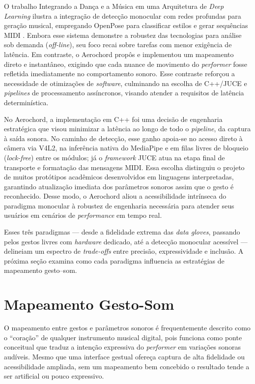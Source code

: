 O trabalho Integrando a Dança e a Música em uma Arquitetura de \textit{Deep Learning} ilustra a integração de detecção monocular com redes profundas para geração musical, empregando OpenPose para classificar estilos e gerar sequências MIDI \cite{Lima2021Integrando}. Embora esse sistema demonstre a robustez das tecnologias para análise sob demanda (\textit{off-line}), seu foco recai sobre tarefas com menor exigência de latência. Em contraste, o Aerochord propôs e implementou um mapeamento direto e instantâneo, exigindo que cada nuance de movimento do \textit{performer} fosse refletida imediatamente no comportamento sonoro. Esse contraste reforçou a necessidade de otimizações de \textit{software}, culminando na escolha de C++/JUCE e \textit{pipelines} de processamento assíncronos, visando atender a requisitos de latência determinística.

No Aerochord, a implementação em C++ foi uma decisão de engenharia estratégica que visou minimizar a latência ao longo de todo o \textit{pipeline}, da captura à saída sonora. No caminho de detecção, esse ganho apoia-se no acesso direto à câmera via V4L2, na inferência nativa do MediaPipe e em filas livres de bloqueio (\textit{lock-free}) entre os módulos; já o \textit{framework} JUCE atua na etapa final de transporte e formatação das mensagens MIDI. Essa escolha distinguiu o projeto de muitos protótipos acadêmicos desenvolvidos em linguagens interpretadas, garantindo atualização imediata dos parâmetros sonoros assim que o gesto é reconhecido. Desse modo, o Aerochord aliou a acessibilidade intrínseca do paradigma monocular à robustez de engenharia necessária para atender seus usuários em cenários de \textit{performance} em tempo real.

Esses três paradigmas — desde a fidelidade extrema das \textit{data gloves}, passando pelos gestos livres com \textit{hardware} dedicado, até a detecção monocular acessível — delineiam um espectro de \textit{trade-offs} entre precisão, expressividade e inclusão. A próxima seção examina como cada paradigma influencia as estratégias de mapeamento gesto–som.

\section{Mapeamento Gesto-Som}
\label{sec:mapeamento_gesto_som}

O mapeamento entre gestos e parâmetros sonoros é frequentemente descrito como o “coração” de qualquer instrumento musical digital, pois funciona como ponte conceitual que traduz a intenção expressiva do \textit{performer} em variações sonoras audíveis. Mesmo que uma interface gestual ofereça captura de alta fidelidade ou acessibilidade ampliada, sem um mapeamento bem concebido o resultado tende a ser artificial ou pouco expressivo. 

